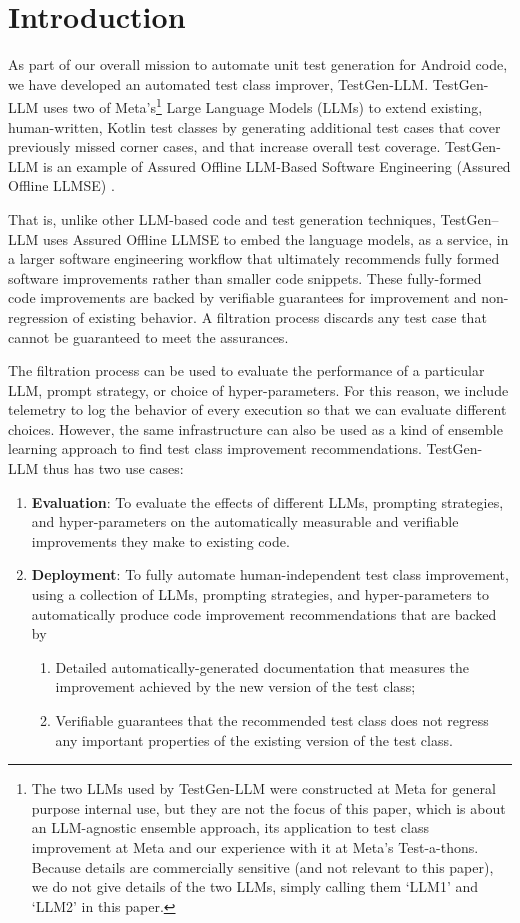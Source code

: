 \documentclass[sigconf,screen]{acmart}
\begin{document}
\section{Introduction}
As part of our overall mission to automate unit test generation for Android code, we have developed an automated test class improver, TestGen-LLM.
TestGen-LLM uses two of Meta's\footnote{The two LLMs used by TestGen-LLM were constructed at Meta for general purpose internal use, but they are not the focus of this paper, which is about an LLM-agnostic ensemble approach, its application to test class improvement at Meta and our experience with it at Meta's Test-a-thons. 
Because details are commercially sensitive (and not relevant to this paper), we do not give details of the two LLMs, simply calling them `LLM1' and `LLM2' in this paper. } Large Language Models (LLMs) to extend existing, human-written, Kotlin test classes by generating additional test cases that cover previously missed corner cases, and that increase overall test coverage.
TestGen-LLM is an example of Assured Offline LLM-Based Software Engineering (Assured Offline LLMSE) \cite{mhetal:intense24-keynote}.

That is, unlike other LLM-based code and test generation techniques, TestGen–LLM uses Assured Offline LLMSE to embed the language models, as a service, in a larger software engineering workflow that ultimately recommends fully formed software  improvements rather than smaller code snippets.
These fully-formed code improvements are backed by verifiable guarantees for improvement and non-regression of existing behavior.
A filtration process discards any test case that cannot be guaranteed to meet the assurances.

The filtration process can be used to evaluate the performance of a particular LLM, prompt strategy, or choice of hyper-parameters. 
For this reason, we include telemetry to log the behavior of every execution so that we can evaluate different choices.
However, the same infrastructure can also be used as a kind of ensemble learning approach to find test class improvement recommendations.
TestGen-LLM thus has two use cases:


\begin{enumerate}
\item {\bf Evaluation}: To evaluate the effects of different LLMs, prompting strategies,  and hyper-parameters  on the automatically measurable and verifiable improvements they make to existing code.
\item {\bf Deployment}: To fully automate human-independent test class improvement, using a collection of LLMs, prompting strategies, and hyper-parameters to automatically produce code improvement recommendations that are backed by  
\begin{enumerate}
    \item Detailed automatically-generated documentation that measures the improvement achieved by the new version of the test class;
    \item Verifiable guarantees that the recommended test class does not regress any important properties of the existing version of the test class.
\end{enumerate}
\end{enumerate}
\end{document}
